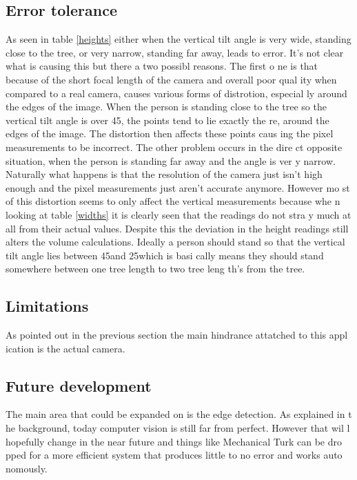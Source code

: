 \subsection{Error tolerance}
As seen in table \ref{heights} either when the vertical tilt angle is very wide,
 standing close to the tree, or very narrow, standing far away, leads to error. 
It's not clear what is causing this but there a two possibl reasons. The first o
ne is that because of the short focal length of the camera and overall poor qual
ity when compared to a real camera, causes various forms of distrotion, especial
ly around the edges of the image. When the person is standing close to the tree 
so the vertical tilt angle is over 45\degree, the points tend to lie exactly the
re, around the edges of the image. The distortion then affects these points caus
ing the pixel measurements to be incorrect. The other problem occurs in the dire
ct opposite situation, when the person is standing far away and the angle is ver
y narrow. Naturally what happens is that the resolution of the camera just isn't
 high enough and the pixel measurements just aren't accurate anymore. However mo
st of this distortion seems to only affect the vertical measurements because whe
n looking at table \ref{widths} it is clearly seen that the readings do not stra
y much at all from their actual values. Despite this the deviation in the height
 readings still alters the volume calculations. Ideally a person should stand so
 that the vertical tilt angle lies between 45\degree and 25\degree which is basi
cally means they should stand somewhere between one tree length to two tree leng
th's from the tree.
\subsection{Limitations}
As pointed out in the previous section the main hindrance attatched to this appl
ication is the actual camera. 
\subsection{Future development}
The main area that could be expanded on is the edge detection. As explained in t
he background, today computer vision is still far from perfect. However that wil
l hopefully change in the near future and things like Mechanical Turk can be dro
pped for a more efficient system that produces little to no error and works auto
nomously.

